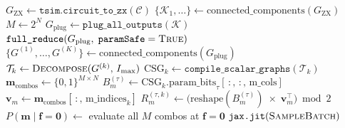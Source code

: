 \documentclass[a4paper,onecolumn,11pt,accepted=2026-06-10]{quantumarticle}
\begin{document}
\begin{algorithm}[H]
\begin{algorithmic}[1]
    \State $G_{\mathrm{ZX}} \gets \texttt{tsim.circuit\_to\_zx}(\mathcal{C})$
    \State $\{\mathcal{K}_1, \ldots\} \gets \mathrm{connected\_components}(G_{\mathrm{ZX}})$
        \State $M \gets 2^N$
        \State $G_{\mathrm{plug}} \gets \texttt{plug\_all\_outputs}(\mathcal{K})$
        \State $\texttt{full\_reduce}(G_{\mathrm{plug}},\; \texttt{paramSafe}=\textsc{True})$
        \State $\{G^{(1)},\ldots,G^{(K)}\} \gets \mathrm{connected\_components}(G_{\mathrm{plug}})$
        \Statex
            \State $\mathcal{T}_k \gets \textsc{Decompose}(G^{(k)},\, I_{\max})$
            \State $\mathrm{CSG}_k \gets \texttt{compile\_scalar\_graphs}(\mathcal{T}_k)$
        \EndFor
        \Statex
        \State $\mathbf{m}_{\mathrm{combos}} \gets \{0,1\}^{M \times N}$
        \Statex
                \State $B_m^{(\tau)} \gets \mathrm{CSG}_k.\mathrm{param\_bits}_\tau[\,:,\, :,\, \mathrm{m\_cols}]$
                \State $\mathbf{v}_m \gets \mathbf{m}_{\mathrm{combos}}[\,:,\, \mathrm{m\_indices}_k]$
                \State $R_m^{(\tau,k)} \gets \bigl(\mathrm{reshape}(B_m^{(\tau)}) \;\times\; \mathbf{v}_m^\top\bigr) \bmod 2$
            \EndFor
        \EndFor
        \Statex
        \State $P(\mathbf{m} \mid \mathbf{f}\!=\!\mathbf{0}) \gets$ evaluate all $M$ combos at $\mathbf{f}=\mathbf{0}$
    \EndFor
    \State \Return $\texttt{jax.jit}(\textsc{SampleBatch})$
\EndFunction
\end{algorithmic}
\end{algorithm}
\end{document}
